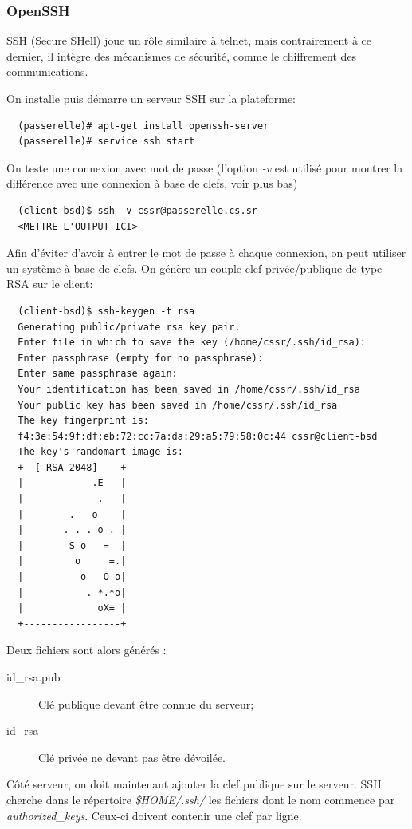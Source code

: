 \documentclass[a4paper]{article}
\begin{document}
\subsubsection{OpenSSH}

SSH (Secure SHell) joue un rôle similaire à telnet, mais contrairement à ce
dernier, il intègre des mécanismes de sécurité, comme le chiffrement des
communications.

On installe puis démarre un serveur SSH sur la plateforme:
\begin{verbatim}
  (passerelle)# apt-get install openssh-server
  (passerelle)# service ssh start
\end{verbatim}

On teste une connexion avec mot de passe (l'option \textit{-v} est
utilisé pour montrer la différence avec une connexion à base de
clefs, voir plus bas)
\begin{verbatim}
  (client-bsd)$ ssh -v cssr@passerelle.cs.sr
  <METTRE L'OUTPUT ICI>
\end{verbatim}

Afin d'éviter d'avoir à entrer le mot de passe à chaque connexion, on peut
utiliser un système à base de clefs. On génère un couple clef privée/publique
de type RSA sur le client:
\begin{verbatim}
  (client-bsd)$ ssh-keygen -t rsa
  Generating public/private rsa key pair.
  Enter file in which to save the key (/home/cssr/.ssh/id_rsa): 
  Enter passphrase (empty for no passphrase): 
  Enter same passphrase again: 
  Your identification has been saved in /home/cssr/.ssh/id_rsa
  Your public key has been saved in /home/cssr/.ssh/id_rsa
  The key fingerprint is:
  f4:3e:54:9f:df:eb:72:cc:7a:da:29:a5:79:58:0c:44 cssr@client-bsd
  The key's randomart image is:
  +--[ RSA 2048]----+
  |            .E   |
  |             .   |
  |        .   o    |
  |       . . . o . |
  |        S o   =  |
  |         o     =.|
  |          o   O o|
  |           . *.*o|
  |             oX= |
  +-----------------+
\end{verbatim}

Deux fichiers sont alors générés :
\begin{description}
	\item[id\_rsa.pub]	Clé publique devant être connue du serveur;
	\item[id\_rsa] 		Clé privée ne devant pas être dévoilée.
\end{description}

Côté serveur, on doit maintenant ajouter la clef publique sur le
serveur. SSH cherche dans le répertoire \textit{\$HOME/.ssh/} les
fichiers dont le nom commence par \textit{authorized\_keys}. Ceux-ci
doivent contenir une clef par ligne.
\end{document}
